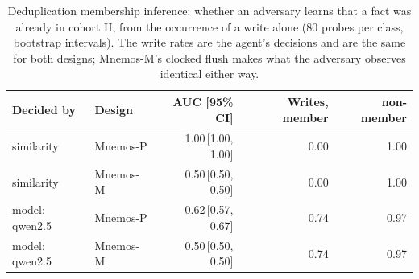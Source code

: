 \begin{table}[t]
\centering
\caption{Deduplication membership inference: whether an adversary learns that a fact was already
in cohort H, from the occurrence of a write alone (80 probes per class,
bootstrap intervals). The write rates are the agent's decisions and are the same for both designs;
Mnemos-M's clocked flush makes what the adversary observes identical either way.}
\label{tab:e3}
\small
\setlength{\tabcolsep}{4pt}
\begin{tabular}{llrrr}
\toprule
Decided by & Design & AUC [95\% CI] & Writes, member & non-member \\
\midrule
similarity & Mnemos-P & 1.00\,[1.00, 1.00] & 0.00 & 1.00 \\
similarity & Mnemos-M & 0.50\,[0.50, 0.50] & 0.00 & 1.00 \\
model: qwen2.5 & Mnemos-P & 0.62\,[0.57, 0.67] & 0.74 & 0.97 \\
model: qwen2.5 & Mnemos-M & 0.50\,[0.50, 0.50] & 0.74 & 0.97 \\
\bottomrule
\end{tabular}
\end{table}
